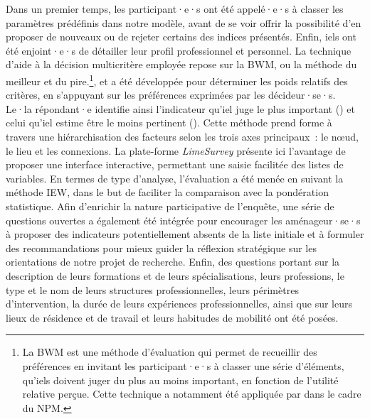 \begin{refsegment}
Dans un premier temps, les participant·e·s ont été appelé·e·s à classer les paramètres prédéfinis dans notre modèle, avant de se voir offrir la possibilité d’en proposer de nouveaux ou de rejeter certains des indices présentés. Enfin, iels ont été enjoint·e·s de détailler leur profil professionnel et personnel. La technique d'aide à la décision multicritère employée repose sur la \acrfull{BWM}, ou la méthode du meilleur et du pire.\footnote{
    La \acrfull{BWM} est une méthode d'évaluation qui permet de recueillir des préférences en invitant les participant·e·s à classer une série d'éléments, qu'iels doivent juger du plus au moins important, en fonction de l'utilité relative perçue. Cette technique a notamment été appliquée par \textcolor{blue}{\textcite[8]{groenendijk_incorporating_2018}} dans le cadre du \acrshort{NPM}.
}, et a été développée pour déterminer les poids relatifs des critères, en s'appuyant sur les préférences exprimées par les décideur·se·s. Le·la répondant·e identifie ainsi l'indicateur qu'iel juge le plus important () et celui qu'iel estime être le moins pertinent (). Cette méthode prend forme à travers une hiérarchisation des facteurs selon les trois axes principaux~: le nœud, le lieu et les connexions. La plate-forme \textsl{LimeSurvey} présente ici l'avantage de proposer une interface interactive, permettant une saisie facilitée des listes de variables. En termes de type d'analyse, l'évaluation a été menée en suivant la méthode \acrshort{IEW}, dans le but de faciliter la comparaison avec la pondération statistique. Afin d’enrichir la nature participative de l'enquête, une série de questions ouvertes a également été intégrée pour encourager les aménageur·se·s à proposer des indicateurs potentiellement absents de la liste initiale et à formuler des recommandations pour mieux guider la réflexion stratégique sur les orientations de notre projet de recherche. Enfin, des questions portant sur la description de leurs formations et de leurs spécialisations, leurs professions, le type et le nom de leurs structures professionnelles, leurs périmètres d'intervention, la durée de leurs expériences professionnelles, ainsi que sur leurs lieux de résidence et de travail et leurs habitudes de mobilité ont été posées.%


\end{refsegment}
